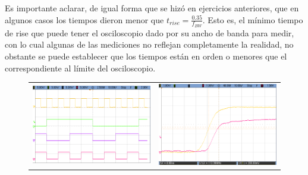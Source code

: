 Es importante aclarar, de igual forma que se hiz\'o en ejercicios anteriores, que en algunos casos los tiempos dieron menor que $t_{rise} = \frac{0.35}{f_{BW}}$. Esto es, el m\'inimo tiempo
de rise que puede tener el osciloscopio dado por su ancho de banda para medir, con lo cual algunas de las mediciones no reflejan completamente la realidad, no obstante se puede establecer que los tiempos est\'an en orden o menores
que el correspondiente al l\'imite del osciloscopio.

\begin{figure}[H]
    \centering
        \begin{tabular}{c c}
            \includegraphics[scale=0.2]{../EJ7/Mediciones/Osciloscopio/Segundo_Intento/Asincronico/cropped_contador.png} &
            \includegraphics[scale=0.2]{../EJ7/Mediciones/Osciloscopio/Segundo_Intento/Asincronico/cropped_salida_q0.png} \\

\end{tabular}
\end{figure}
